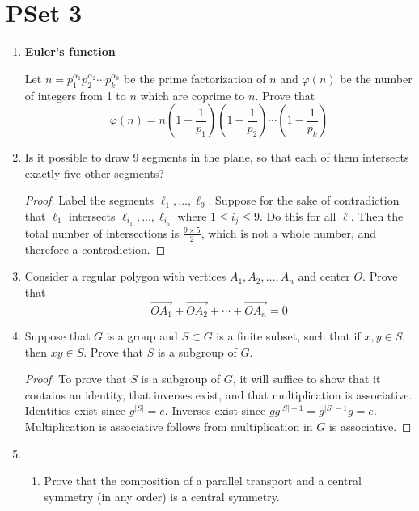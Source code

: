 \documentclass[../apprentice.tex]{subfiles}
\begin{document}
\section{PSet 3}
\begin{enumerate}
    \item {}\textbf{Euler's function}\par
    Let $n=p_1^{\alpha_1}p_2^{\alpha_2}\cdots p_k^{\alpha_k}$ be the prime factorization of $n$ and $\varphi(n)$ be the number of integers from 1 to $n$ which are coprime to $n$. Prove that
    \begin{equation*}
        \varphi(n) = n\left( 1-\frac{1}{p_1} \right)\left( 1-\frac{1}{p_2} \right)\cdots\left( 1-\frac{1}{p_k} \right)
    \end{equation*}
    \item Is it possible to draw 9 segments in the plane, so that each of them intersects exactly five other segments?
    \begin{proof}
        Label the segments $\ell_1,\dots,\ell_9$. Suppose for the sake of contradiction that $\ell_1$ intersects $\ell_{i_1},\dots,\ell_{i_5}$ where $1\leq i_j\leq 9$. Do this for all $\ell$. Then the total number of intersections is $\frac{9\times 5}{2}$, which is not a whole number, and therefore a contradiction.
    \end{proof}
    \item Consider a regular polygon with vertices $A_1,A_2,\dots,A_n$ and center $O$. Prove that
    \begin{equation*}
        \overrightarrow{OA_1}+\overrightarrow{OA_2}+\cdots+\overrightarrow{OA_n} = 0
    \end{equation*}
    \item Suppose that $G$ is a group and $S\subset G$ is a finite subset, such that if $x,y\in S$, then $xy\in S$. Prove that $S$ is a subgroup of $G$.
    \begin{proof}
        To prove that $S$ is a subgroup of $G$, it will suffice to show that it contains an identity, that inverses exist, and that multiplication is associative. Identities exist since $g^{|S|}=e$. Inverses exist since $gg^{|S|-1}=g^{|S|-1}g=e$. Multiplication is associative follows from multiplication in $G$ is associative.
    \end{proof}
    \item 
    \begin{enumerate}
        \item Prove that the composition of a parallel transport and a central symmetry (in any order) is a central symmetry.

\end{enumerate}
\end{enumerate}
\end{document}
